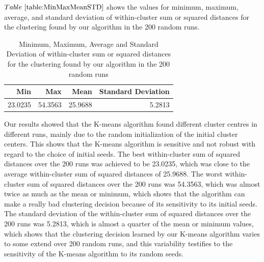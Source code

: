 \documentclass{article} %
\begin{document}
$Table~\ref{table:MinMaxMeanSTD}$ shows the values for minimum, maximum, average, and standard deviation of within-cluster sum or squared distances for the clustering found by our algorithm in the 200 random runs.

\begin{table}[H]
\begin{center}
\centering
\caption{\small{Minimum, Maximum, Average and Standard Deviation of within-cluster sum or squared distances for the clustering found by our algorithm in the 200 random runs}}
\begin{tabular}{|r|r|r|r|}
\hline
Min & Max & Mean & Standard Deviation \\\hline
23.0235&54.3563&25.9688&5.2813\\\hline
\end{tabular}
\end{center}
\label{table:MinMaxMeanSTD}
\end{table}


Our results showed that the K-means algorithm found different cluster centres in different runs, mainly due to the random initialization of the initial cluster centers. This shows that the K-means algorithm is sensitive and not robust with regard to the choice of initial seeds. The best within-cluster sum of squared distances over the 200 runs was achieved to be 23.0235, which was close to the average within-cluster sum of squared distances of 25.9688. The worst within-cluster sum of squared distances over the 200 runs was 54.3563, which was almost twice as much as the mean or minimum, which shows that the algorithm can make a really bad clustering decision because of its sensitivity to its initial seeds. The standard deviation of the within-cluster sum of squared distances over the 200 runs was 5.2813, which is almost a quarter of the mean or minimum values, which shows that the clustering decision learned by our K-means algorithm varies to some extend over 200 random runs, and this variability testifies to the sensitivity of the K-means algorithm to its random seeds.
\end{document}
